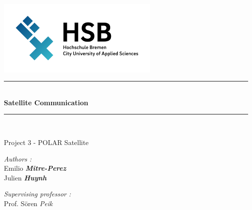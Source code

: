\documentclass[a4paper,12pt,calibri,oneside,openany]{book}
\theoremstyle{break}
\begin{document}
\renewcommand{\bibname}{Bibliographie et Webographie}

\begin{titlepage}
\begin{center}

\includegraphics[width=0.6\textwidth]{logohsb}\\[1cm]



\rule{\linewidth}{0.5mm} \\[0.4cm]
{ \huge \bfseries Satellite Communication\\[0.4cm] }
\rule{\linewidth}{0.5mm} \\[1.cm]
\begin{center}
		Project 3 - POLAR Satellite
\end{center}
\noindent
\begin{minipage}{0.4\textwidth}
  \begin{flushleft} \large
    \emph{Authors :}\\
    Emilio \textbf{\textit{Mitre-Perez}}\\
    Julien \textbf{\textit{Huynh}}\
  \end{flushleft}
\end{minipage}%
\begin{minipage}{0.4\textwidth}
  \begin{flushright} \large
    \emph{Supervising professor :} \\
    Prof. Sören \textit{Peik}\\
  \end{flushright}
\end{minipage}

\vfill



\end{center}
\end{titlepage}
\end{document}
